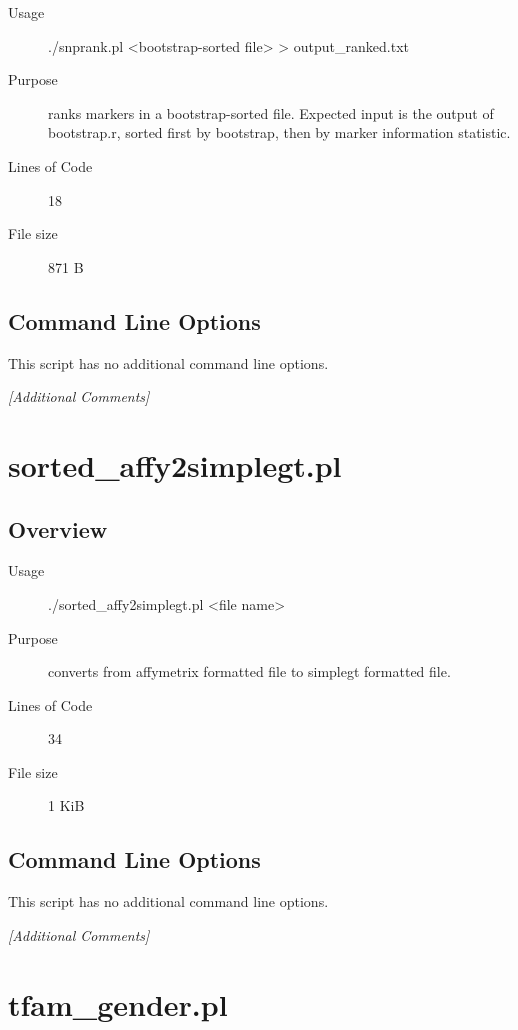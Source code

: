 \begin{description}
\item[Usage] ./snprank.pl <bootstrap-sorted file> > output_ranked.txt
\item[Purpose] ranks markers in a bootstrap-sorted file. Expected input is the output of bootstrap.r, sorted first by bootstrap, then by marker information statistic.
\item[Lines of Code] 18
\item[File size] 871 B
\end{description}

\subsection{Command Line Options}
\label{sec:snprank.pl-command-line}

This script has no additional command line options.

\emph{[Additional Comments]}

\section{sorted_affy2simplegt.pl}
\label{sec:sorted-affy2simplegt.pl}

\subsection{Overview}
\label{sec:sorted-affy2simplegt.pl-overview}

\begin{description}
\item[Usage] ./sorted_affy2simplegt.pl <file name>
\item[Purpose] converts from affymetrix formatted file to simplegt formatted file.
\item[Lines of Code] 34
\item[File size] 1 KiB
\end{description}

\subsection{Command Line Options}
\label{sec:sorted-affy2simplegt.pl-command-line}

This script has no additional command line options.

\emph{[Additional Comments]}

\section{tfam_gender.pl}
\label{sec:tfam-gender.pl}

